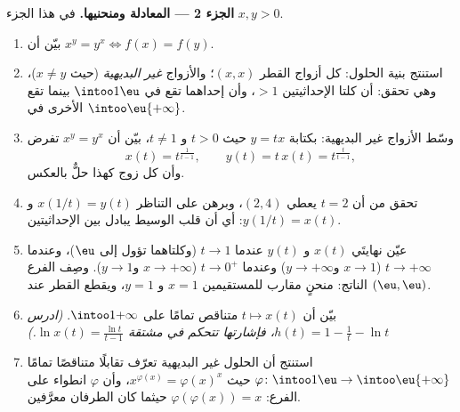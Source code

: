 \begin{problem}
\medskip
\noindent\textbf{الجزء 2 --- المعادلة ومنحنيها.} في هذا
الجزء $x, y > 0$.
\begin{enumerate}[resume]
  \item بيّن أن $x^y = y^x \iff f(x) = f(y)$.
  \item استنتج بنية  الحلول: كل أزواج القطر
        $(x, x)$؛ والأزواج \emph{غير البديهية} (حيث $x \neq
        y$)، وهي تحقق: أن كلتا الإحداثيتين $> 1$، وأن إحداهما
        تقع في $\intoo1\eu$ بينما تقع الأخرى في
        $\intoo\eu{+\infty}$.
  \item وسّط الأزواج غير البديهية: بكتابة $y = tx$ حيث $t
        > 0$ و $t \neq 1$، بيّن أن $x^y = y^x$ تفرض
        \[
        x(t) = t^{\frac1{t-1}},
        \qquad
        y(t) = t\,x(t) = t^{\frac{t}{t-1}},
        \]
        وأن كل زوج كهذا حلٌّ بالعكس.
  \item تحقق من أن $t = 2$ يعطي $(2, 4)$، وبرهن على التناظر
        $x(1/t) = y(t)$ و $y(1/t) = x(t)$: أي أن قلب الوسيط
        يبادل بين الإحداثيتين.
  \item عيّن نهايتَي $x(t)$ و $y(t)$ عندما $t \to 1$
        (وكلتاهما تؤول إلى $\eu$)، وعندما $t \to +\infty$ ($x \to 1$ و$y
        \to +\infty$) وعندما $t \to 0^+$ ($x \to +\infty$ و$y \to
        1$). وصِف الفرع الناتج: منحنٍ مقارب
        للمستقيمين $x = 1$ و $y = 1$، ويقطع القطر عند
        $(\eu, \eu)$.
  \item بيّن أن $t \mapsto x(t)$ متناقص تمامًا على
        $\intoo1{+\infty}$. \emph{(ادرس $h(t) = 1 - \frac1t - \ln
        t$، فإشارتها تتحكم في مشتقة $\ln x(t) =
        \frac{\ln t}{t - 1}$.)}
  \item استنتج أن الحلول غير البديهية تعرّف تقابلًا متناقصًا
        تمامًا $\varphi \colon \intoo1\eu \to
        \intoo\eu{+\infty}$ حيث $x^{\varphi(x)} = \varphi(x)^x$،
        وأن $\varphi$ انطواء على الفرع:
        $\varphi(\varphi(x)) = x$ حيثما كان الطرفان معرَّفين.
\end{enumerate}


\end{problem}
